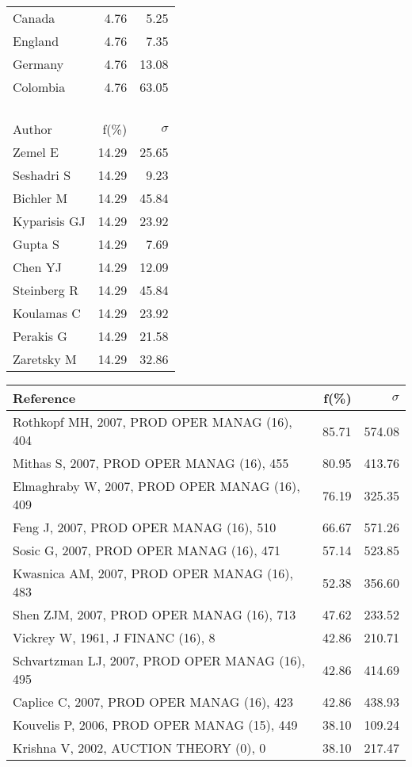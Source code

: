 \documentclass[a4paper,11pt]{report}
\begin{document}
\begin{landscape}
\begin{table}[!ht]
{\begin{tabular}{|l r r|}
Canada & 4.76 & 5.25\\
England & 4.76 & 7.35\\
Germany & 4.76 & 13.08\\
Colombia & 4.76 & 63.05\\
 &  & \\
 &  & \\
 &  & \\
 &  & \\
\hline
\hline
Author & f(\%) & $\sigma$\\
\hline
Zemel E & 14.29 & 25.65\\
Seshadri S & 14.29 & 9.23\\
Bichler M & 14.29 & 45.84\\
Kyparisis GJ & 14.29 & 23.92\\
Gupta S & 14.29 & 7.69\\
Chen YJ & 14.29 & 12.09\\
Steinberg R & 14.29 & 45.84\\
Koulamas C & 14.29 & 23.92\\
Perakis G & 14.29 & 21.58\\
Zaretsky M & 14.29 & 32.86\\
\hline
\end{tabular}
}
{\scriptsize\begin{tabular}{|l r r|}
\hline
Reference & f(\%) & $\sigma$\\
\hline
Rothkopf MH, 2007, PROD OPER MANAG (16), 404 & 85.71 & 574.08\\
Mithas S, 2007, PROD OPER MANAG (16), 455 & 80.95 & 413.76\\
Elmaghraby W, 2007, PROD OPER MANAG (16), 409 & 76.19 & 325.35\\
Feng J, 2007, PROD OPER MANAG (16), 510 & 66.67 & 571.26\\
Sosic G, 2007, PROD OPER MANAG (16), 471 & 57.14 & 523.85\\
Kwasnica AM, 2007, PROD OPER MANAG (16), 483 & 52.38 & 356.60\\
Shen ZJM, 2007, PROD OPER MANAG (16), 713 & 47.62 & 233.52\\
Vickrey W, 1961, J FINANC (16), 8 & 42.86 & 210.71\\
Schvartzman LJ, 2007, PROD OPER MANAG (16), 495 & 42.86 & 414.69\\
Caplice C, 2007, PROD OPER MANAG (16), 423 & 42.86 & 438.93\\
Kouvelis P, 2006, PROD OPER MANAG (15), 449 & 38.10 & 109.24\\
Krishna V, 2002, AUCTION THEORY (0), 0 & 38.10 & 217.47\\

\end{tabular}}
\end{table}
\end{landscape}
\end{document}
